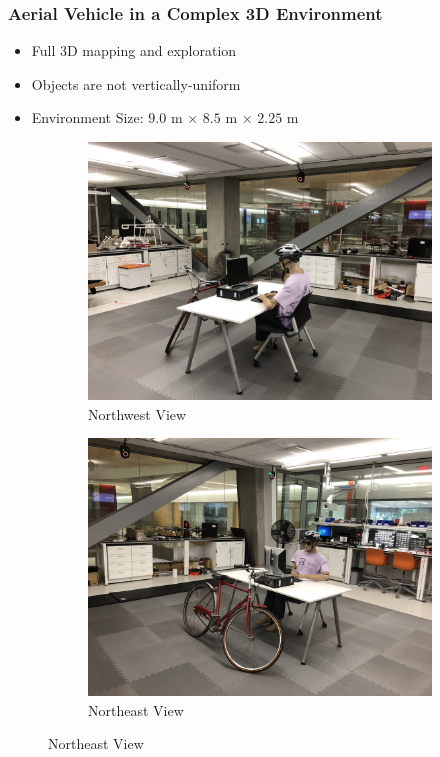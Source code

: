 \documentclass[11pt,professionalfonts,hyperref={pdftex,pdfpagemode=none,pdfstartview=FitH}]{beamer}
\begin{document}
\begin{frame}
\frametitle{Aerial Vehicle in a Complex 3D Environment}
\begin{itemize}
        	\item Full 3D mapping and exploration
	\item Objects are not vertically-uniform
	\item Environment Size: $9.0$ m $\times$ $8.5$ m $\times$ $2.25$ m
\end{itemize}


\begin{figure}
  \centering
  \begin{subfigure}[t]{.4\linewidth}
    \centering\includegraphics[height=.7\linewidth]{explore3D_space_NW.JPG}
    \caption*{Northwest View}
  \end{subfigure}
  \begin{subfigure}[t]{.4\linewidth}
    \centering\includegraphics[height=.7\linewidth]{explore3D_space_NE.JPG}
    \caption*{Northeast View}
  \end{subfigure}
\end{figure}
\end{frame}
\end{document}
